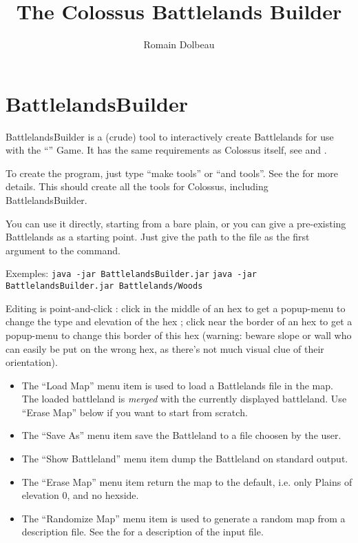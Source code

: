 \documentclass{article}
\begin{document}

\title{The Colossus Battlelands Builder}

\author{Romain Dolbeau}

\maketitle

\section{BattlelandsBuilder}

BattlelandsBuilder is a (crude) tool to interactively
create Battlelands for use with the
``'' Game.
It has the same requirements as Colossus itself, see
and
.

To create the program, just type ``make tools'' or ``and tools''.
See the
for more details.
This should create all the tools for Colossus, including
BattlelandsBuilder.

You can use it directly, starting from a bare plain,
or you can give a pre-existing Battlelands as a
starting point. Just give the path to the file as
the first argument to the command.

Exemples:
\texttt{java -jar BattlelandsBuilder.jar}
\texttt{java -jar BattlelandsBuilder.jar Battlelands/Woods}

Editing is point-and-click : click in the middle
of an hex to get a popup-menu to change the type
and elevation of the hex ; click near the border of
an hex to get a popup-menu to change this border of
this hex (warning: beware slope or wall who can
easily be put on the wrong hex, as there's not much
visual clue of their orientation).

\begin{itemize}

\item The ``Load Map'' menu item is used to load a Battlelands 
file in the map. The loaded battleland is \emph{merged}
with the currently displayed battleland. Use ``Erase Map''
below if you want to start from scratch.

\item The ``Save As'' menu item save the Battleland to a
file choosen by the user.

\item The ``Show Battleland'' menu item dump the Battleland
on standard output.

\item The ``Erase Map'' menu item return the map to the
default, i.e. only Plains of elevation 0, and no
hexside.

\item The ``Randomize Map'' menu item is used to generate
a random map from a description file. See the
for a description of the input file.

\end{itemize}
\end{document}
